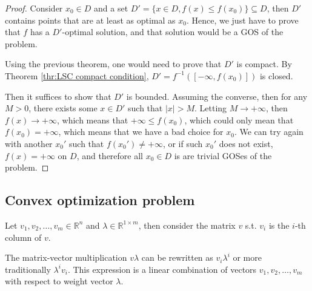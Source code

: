 \begin{proof}
  Consider \( x_{0} \in D \) and a set \( D' = \{x \in D, f(x) \le f(x_{0})\}
  \subseteq D \), then \( D' \) contains points that are at least as optimal as
  \( x_{0} \). Hence, we just have to prove that \( f \) has a \( D' \)-optimal
  solution, and that solution would be a GOS of the problem.

  Using the previous theorem, one would need to prove that \( D' \) is compact. By
  Theorem \ref{thr:LSC compact condition}, \( D' = f^{-1}([-\infty,
  f(x_{0})]) \) is closed.
  
  Then it suffices to show that \( D' \) is bounded. Assuming the converse, then
  for any \( M > 0 \), there exists some \( x
  \in D' \) such that \( |x| > M \). Letting \( M \to  +\infty \), then \( f(x)
  \to  +\infty\), which means that \( +\infty \le f(x_{0}) \), which could only
  mean that \( f(x_{0}) = +\infty \), which means that we have
  a bad choice for \( x_{0} \). We can try again with another \( x_{0}' \) such
  that \( f(x_{0}') \neq +\infty \), or if such \( x_{0}'\) does not exist, \(
  f(x) = +\infty \) on \( D \), and therefore all \( x_{0} \in D \) is are trivial
  GOSes of the problem.
\end{proof}


\subsection{Convex optimization problem} %
\label{sub:Convex optimization problem}

Let \( v_{1}, v_{2}, \ldots , v_{m} \in \mathbb{R}^{n} \) and \( \lambda \in
\mathbb{R}^{1\times m} \), then consider the matrix \( v \) s.t. \( v_{i} \) is
the \( i \)-th column of \( v \).

The matrix-vector multiplication \( v \lambda \) can be rewritten as \( v_{i}
\lambda^{i} \) or more traditionally \( \lambda^{i}v_{i} \). This expression is
a linear combination of vectors \( v_{1}, v_{2}, \ldots , v_{m} \) with respect
to weight vector \( \lambda \).

